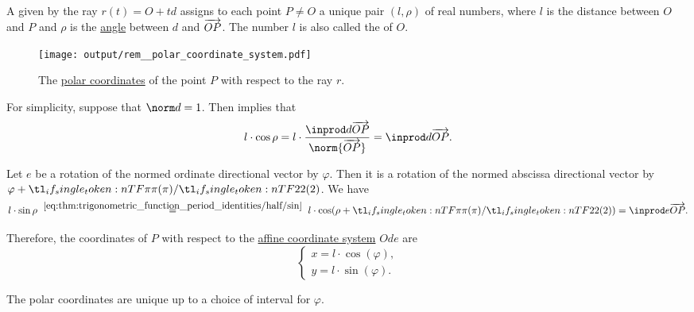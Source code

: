 \begin{remark}\label{rem:polar_coordinate_system}
  A  given by the ray \( r(t) = O + td \) assigns to each point \( P \neq O \) a unique pair \( (l, \rho) \) of real numbers, where \( l \) is the distance between \( O \) and \( P \) and \( \rho \) is the \hyperref[def:angle]{angle} between \( d \) and \( \overrightarrow{OP} \). The number \( l \) is also called the  of \( O \).

  \begin{figure}[!ht]
    \centering
    \texttt{[image: output/rem\_\_polar\_coordinate\_system.pdf]}
    \caption{The \hyperref[rem:polar_coordinate_system]{polar coordinates} of the point \( P \) with respect to the ray \( r \).}\label{fig:rem:polar_coordinate_system}
  \end{figure}

  For simplicity, suppose that \( \norm d = 1 \). Then  implies that
  \begin{equation*}
    l \cdot \cos \rho = l \cdot \frac {\inprod d {\vect{OP}}} {\norm{\vect{OP}}} = \inprod d {\vect{OP}}.
  \end{equation*}

  Let \( e \) be a rotation of the normed ordinate directional vector by \( \varphi \). Then it is a rotation of the normed abscissa directional vector by \( \varphi + \ifrac \pi 2 \). We have
  \begin{equation*}
    l \cdot \sin \rho
    \reloset {\eqref{eq:thm:trigonometric_function_period_identities/half/sin}} =
    l \cdot \cos(\rho + \ifrac \pi 2)
    =
    \inprod e {\vect{OP}}.
  \end{equation*}

  Therefore, the coordinates of \( P \) with respect to the \hyperref[def:affine_coordinate_system]{affine coordinate system} \( Ode \) are
  \begin{equation}\label{eq:rem:polar_coordinate_system/simple}
    \begin{cases}
      x = l \cdot \cos(\varphi), \\
      y = l \cdot \sin(\varphi).
    \end{cases}
  \end{equation}

  The polar coordinates are unique up to a choice of interval for \( \varphi \).
\end{remark}

